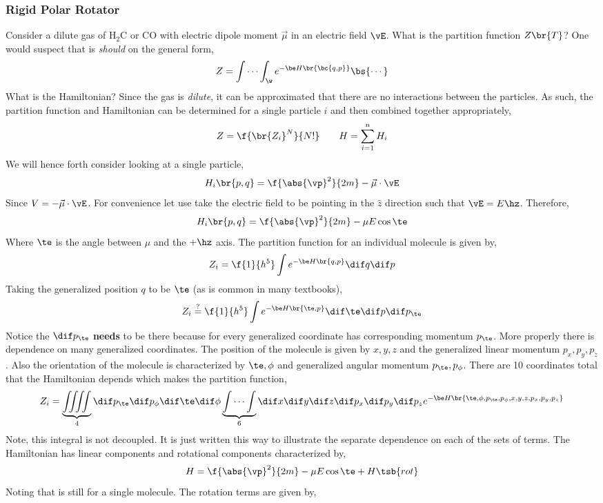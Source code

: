 \documentclass{article}
\begin{document}
\subsubsection{Rigid Polar Rotator} Consider a dilute gas of $\text{H}_2\text{C}$ or $\text{CO}$ with electric dipole moment $\vec{\mu}$ in an electric field $\vE$. What is the partition function $Z\br{T}$? One would suspect that is \textit{should} on the general form,
\[ Z = \idotsint_{\w} e^{-\be H\br{\bc{q,p}}} \bs{ \cdots } \]
What is the Hamiltonian? Since the gas is \textit{dilute}, it can be approximated that there are no interactions between the particles. As such, the partition function and Hamiltonian can be determined for a single particle $i$ and then combined together appropriately,
\[ Z = \f{\br{Z_i}^N}{N!} \qquad H = \sum_{i=1}^{n} H_i \]
We will hence forth consider looking at a single particle,
\[ H_i \br{p,q} = \f{\abs{\vp}^2}{2m} - \vec{\mu} \cdot \vE \]
Since $V = - \vec{\mu} \cdot \vE$. For convenience let use take the electric field to be pointing in the $\hat{z}$ direction such that $\vE = E \hz$. Therefore,
\[ H_i \br{p,q} = \f{\abs{\vp}^2}{2m} - \mu E \cos \te \]
Where $\te$ is the angle between $\mu$ and the $+\hz$ axis. The partition function for an individual molecule is given by,
\[ Z_i = \f{1}{h^5}\int e^{-\be H\br{q,p}} \dif q \dif p \]
Taking the generalized position $q$ to be $\te$ (as is common in many textbooks),
\[ Z_i \stackrel{?}{=} \f{1}{h^5}\int e^{-\be H\br{\te,p}} \dif \te \dif p \dif p_\te \]
Notice the $\dif p_\te$ \textbf{needs} to be there because for every generalized coordinate has corresponding momentum $p_\te$. More properly there is dependence on many generalized coordinates. The position of the molecule is given by $x,y,z$ and the generalized linear momentum $p_x, p_y, p_z$. Also the orientation of the molecule is characterized by $\te, \phi$ and generalized angular momentum $p_\te, p_\phi$. There are 10 coordinates total that the Hamiltonian depends which makes the partition function,
\[ Z_i = \underbrace{\iiiint}_{4} \dif p_\te \dif p_\phi \dif \te \dif \phi \underbrace{\idotsint}_{6} \dif x \dif y \dif z \dif p_x \dif p_y \dif p_z e^{-\be H \br{\te, \phi, p_\te, p_\phi, x, y, z, p_x, p_y, p_z}} \]
Note, this integral is not decoupled. It is just written this way to illustrate the separate dependence on each of the sets of terms. The Hamiltonian has linear components and rotational components characterized by,
\[ H = \f{\abs{\vp}^2}{2m} - \mu E \cos \te + H\tsb{rot} \]
Noting that is still for a single molecule. The rotation terms are given by,
\end{document}
